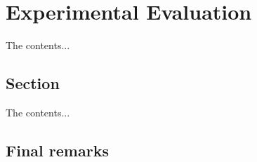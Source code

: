 %
%

\chapter{Experimental Evaluation} %
\label{chap:experimental_evaluation}

The contents...

\section{Section}
The contents...



%
%

\section{Final remarks}